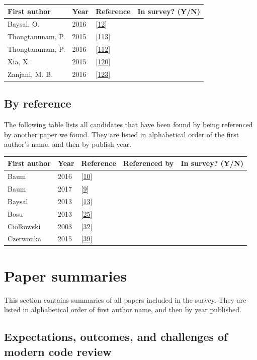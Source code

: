 \documentclass[]{book}
\begin{document}
\begin{longtable}[]{@{}llll@{}}
\toprule
First author & Year & Reference & In survey? (Y/N)\tabularnewline
\midrule
\endhead
Baysal, O. & 2016 &
{[}\protect\hyperlink{ref-baysal2016investigating}{12}{]}
&\tabularnewline
Thongtanunam, P. & 2015 &
{[}\protect\hyperlink{ref-thongtanunam2015should}{113}{]}
&\tabularnewline
Thongtanunam, P. & 2016 &
{[}\protect\hyperlink{ref-thongtanunam2016revisiting}{112}{]}
&\tabularnewline
Xia, X. & 2015 & {[}\protect\hyperlink{ref-xia2015should}{120}{]}
&\tabularnewline
Zanjani, M. B. & 2016 &
{[}\protect\hyperlink{ref-zanjani2016automatically}{123}{]}
&\tabularnewline
\bottomrule
\end{longtable}

\subsection{By reference}\label{by-reference}

The following table lists all candidates that have been found by being
referenced by another paper we found. They are listed in alphabetical
order of the first author's name, and then by publish year.

\begin{longtable}[]{@{}lllll@{}}
\toprule
First author & Year & Reference & Referenced by & In survey?
(Y/N)\tabularnewline
\midrule
\endhead
Baum & 2016 & {[}\protect\hyperlink{ref-baum2016faceted}{10}{]} &
&\tabularnewline
Baum & 2017 & {[}\protect\hyperlink{ref-baum2017choice}{9}{]} &
&\tabularnewline
Baysal & 2013 & {[}\protect\hyperlink{ref-baysal2013influence}{13}{]} &
&\tabularnewline
Bosu & 2013 & {[}\protect\hyperlink{ref-bosu2013impact}{25}{]} &
&\tabularnewline
Ciolkowski & 2003 &
{[}\protect\hyperlink{ref-ciolkowski2003software}{32}{]} &
&\tabularnewline
Czerwonka & 2015 & {[}\protect\hyperlink{ref-czerwonka2015code}{39}{]} &
&\tabularnewline
\bottomrule
\end{longtable}

\section{Paper summaries}\label{paper-summaries}

This section contains summaries of all papers included in the survey.
They are listed in alphabetical order of first author name, and then by
year published.

\subsection{Expectations, outcomes, and challenges of modern code
review}\label{expectations-outcomes-and-challenges-of-modern-code-review}
\end{document}
